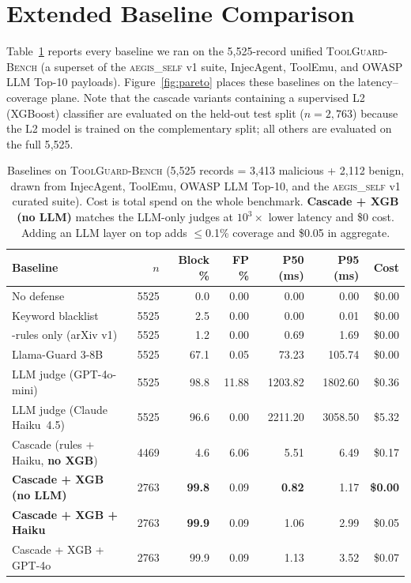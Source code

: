 \clearpage

\section{Extended Baseline Comparison}
\label{app:baselines}

Table~\ref{tab:baseline-full} reports every baseline we ran on the
5{,}525-record unified \textsc{ToolGuard-Bench} (a superset of the
\textsc{aegis\_self} v1 suite, InjecAgent, ToolEmu, and OWASP
LLM Top-10 payloads). Figure~\ref{fig:pareto} places these baselines
on the latency--coverage plane. Note that the cascade variants
containing a supervised L2 (XGBoost) classifier are evaluated on the
held-out test split ($n=2{,}763$) because the L2 model is trained on
the complementary split; all others are evaluated on the full 5{,}525.

\begin{table}[t]
\centering\small
\setlength{\tabcolsep}{4pt}
\begin{tabular}{lrrrrrr}
\toprule
\textbf{Baseline} & $n$ & \textbf{Block \%} & \textbf{FP \%}
                  & \textbf{P50 (ms)} & \textbf{P95 (ms)}
                  & \textbf{Cost} \\
\midrule
No defense                              & 5525 &   0.0 &  0.00 &    0.00 &    0.00 & \$0.00 \\
Keyword blacklist                       & 5525 &   2.5 &  0.00 &    0.00 &    0.01 & \$0.00 \\
\system{}-rules only (arXiv v1)         & 5525 &   1.2 &  0.00 &    0.69 &    1.69 & \$0.00 \\
Llama-Guard 3-8B                        & 5525 &  67.1 &  0.05 &   73.23 &  105.74 & \$0.00 \\
LLM judge (GPT-4o-mini)                 & 5525 &  98.8 & 11.88 & 1203.82 & 1802.60 & \$0.36 \\
LLM judge (Claude Haiku~4.5)            & 5525 &  96.6 &  0.00 & 2211.20 & 3058.50 & \$5.32 \\
Cascade (rules + Haiku, \textbf{no XGB})& 4469 &   4.6 &  6.06 &    5.51 &    6.49 & \$0.17 \\
\textbf{Cascade + XGB (no LLM)}         & 2763 &  \textbf{99.8} &  0.09 & \textbf{0.82} & 1.17 & \textbf{\$0.00} \\
\textbf{Cascade + XGB + Haiku}          & 2763 &  \textbf{99.9} &  0.09 & 1.06 & 2.99 & \$0.05 \\
Cascade + XGB + GPT-4o                  & 2763 &  99.9 &  0.09 & 1.13 & 3.52 & \$0.07 \\
\bottomrule
\end{tabular}
\caption{Baselines on \textsc{ToolGuard-Bench} (5{,}525 records =
3{,}413 malicious + 2{,}112 benign, drawn from InjecAgent, ToolEmu,
OWASP LLM Top-10, and the \textsc{aegis\_self} v1 curated suite).
Cost is total spend on the whole benchmark. \textbf{Cascade + XGB
(no LLM)} matches the LLM-only judges at $10^3\times$ lower latency
and \$0 cost. Adding an LLM layer on top adds $\le$0.1\% coverage
and \$0.05 in aggregate.}
\label{tab:baseline-full}
\end{table}

